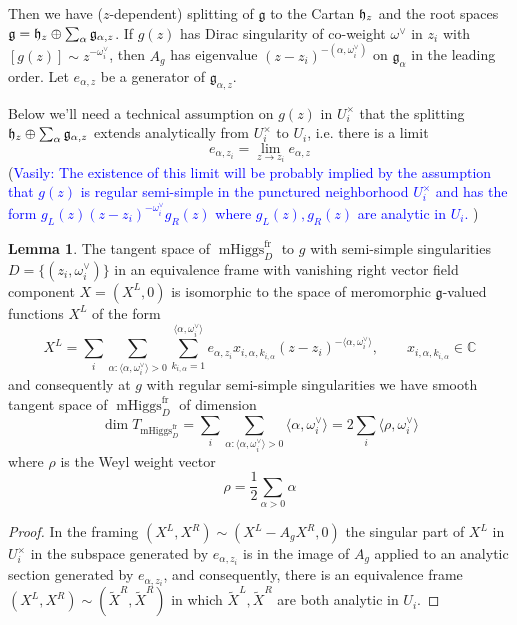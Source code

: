 \documentclass[11pt, oneside, reqno]{amsart}
\theoremstyle{definition} \newtheorem{definition}{Definition}[section]
\newtheorem{lemma}[definition]{Lemma}
\theoremstyle{definition} \newtheorem{remark}[definition]{Remark}
\theoremstyle{definition} \newtheorem{remarks}[definition]{Remarks}
\theoremstyle{definition} \newtheorem{question}[definition]{Question}
\theoremstyle{definition} \newtheorem*{note}{Note}
\theoremstyle{definition} \newtheorem{example}[definition]{Example}
\theoremstyle{definition} \newtheorem{examples}[definition]{Examples}
\renewcommand{\gg}{\mathfrak{g}}
\DeclareMathOperator{\mhiggs}{mHiggs}
\newcommand{\fr}{\mathrm{fr}}
\newcommand{\vasily}[1]{(\textcolor{blue}{Vasily: #1})}
\begin{document}
Then we have ($z$-dependent) splitting of $\gg$ to the Cartan $\mathfrak{h}_z$ and the root spaces 
$\gg = \hh_{z} \oplus \sum_{\alpha} \gg_{\alpha,z}$. 
If $g(z)$ has Dirac singularity of co-weight $\omega^{\vee}$ in $z_i$ with $[g(z) ] \sim z^{-\omega_i^{\vee}}$, then  $A_{g}$ has eigenvalue $ (z - z_i)^{- (\alpha, \omega^{\vee}_{i})}$ on $\gg_{\alpha}$
in the leading order. Let $e_{\alpha, z}$ be a generator of $\gg_{\alpha, z}$.

Below we'll need a technical assumption on $g(z)$ in $U_{i}^{\times}$ that the splitting
$\hh_{z} \oplus \sum_{\alpha} \gg_{\alpha,z}$ extends analytically from $U_{i}^{\times}$ to $U_{i}$,
i.e. there is a limit 
 \[ e_{\alpha, z_i} = \lim_{z \to z_i} e_{\alpha, z}\] 
\vasily{The existence of this limit will be probably implied by the
  assumption that $g(z)$ is regular semi-simple in the punctured
  neighborhood $U_{i}^{\times}$ and has the form $ g_L(z) (z-z_i)^{-\omega_{i}^{\vee}} g_{R}(z)$
  where $g_{L}(z), g_{R}(z)$ are analytic in $U_i$. }


\begin{lemma}
  The tangent space of $\mhiggs^{\fr}_{D}$ to $g$ with semi-simple singularities 
  $D = \{(z_i, \omega^{\vee}_{i})\}$ in an equivalence frame with
  vanishing right vector field component $X = (X^{L}, 0)$ is isomorphic to the
  space of meromorphic $\gg$-valued functions $X^{L}$ of the form
  \begin{equation}
\label{eq:XL}
    X^{L} = \sum_{i} \sum_{\alpha: \langle \alpha, \omega_i^{\vee} \rangle > 0 }
    \sum_{k_{i, \alpha} = 1}^{ \langle \alpha , \omega_i^{\vee} \rangle} e_{\alpha,{z_i}} x_{i, \alpha, k_{i, \alpha}} (z - z_i)^{-\langle \alpha, \omega_i^{\vee}\rangle }, \qquad x_{i, \alpha, k_{i, \alpha}} \in \mathbb{C}
  \end{equation}
  and consequently at $g$ with regular semi-simple singularities we have smooth
  tangent space of $\mhiggs^{\fr}_{D}$ of dimension 
  \begin{equation}
\dim T_{\mhiggs^{\fr}_{D}} = \sum_{i} \sum_{\alpha: \langle \alpha, \omega_i^{\vee} \rangle > 0 } \langle \alpha, \omega_i^{\vee} \rangle = 2 \sum_{i} \langle \rho, \omega^{\vee}_i\rangle 
  \end{equation}
  where $\rho$ is the Weyl weight vector
  \begin{equation}
    \rho = \frac 1 2 \sum_{\alpha > 0} \alpha 
  \end{equation}
\end{lemma}
\begin{proof}
  In the framing $(X^{L}, X^{R}) \sim (X^{L} - A_{g} X^{R}, 0 )$ the singular
  part of $X^{L}$ in $U_{i}^{\times}$ in the subspace generated by $e_{\alpha, z_i}$
  is in the image of $A_{g}$ applied to an analytic section generated by $e_{\alpha, z_i}$,
  and consequently, there is an equivalence frame $(X^{L}, X^{R}) \sim (\tilde X^{R}, \tilde X^{R})$
  in which $\tilde X^{L}, \tilde X^{R}$ are both analytic in $U_{i}$. 
\end{proof}
\end{document}
